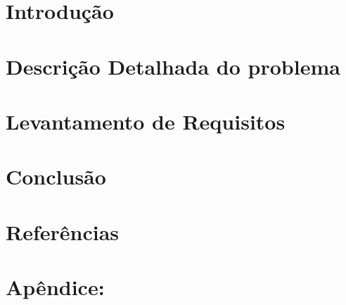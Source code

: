 \documentclass[12pt]{article}
\begin{document}


\newpage{}
\tableofcontents{}
\newpage{}

\section{Introdução}


\section{Descrição Detalhada do problema}


\section{Levantamento de Requisitos}


\section{Conclusão}




\section{Referências}


\section{Apêndice:}
\end{document}
